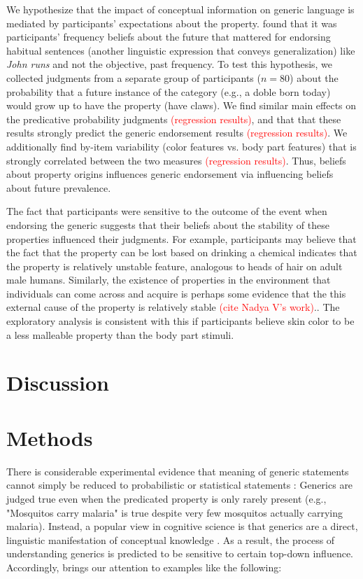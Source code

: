 \documentclass[floatsintext, 11pt, doc]{apa6}
\newcommand{\red}[1]{\textcolor{Red}{#1}}
\begin{document}
We hypothesize that the impact of conceptual information on generic language is mediated by participants' expectations about the property.  found that it was participants' frequency beliefs about the future that mattered for endorsing habitual sentences (another linguistic expression that conveys generalization) like \emph{John runs} and not the objective, past frequency. 
To test this hypothesis, we collected judgments from a separate group of participants ($n = 80$) about the probability that a future instance of the category (e.g., a doble born today) would grow up to have the property (have claws).
We find similar main effects on the predicative probability judgments \red{(regression results)}, and that that these results strongly predict the generic endorsement results \red{(regression results)}.
We additionally find by-item variability (color features vs. body part features) that is strongly correlated between the two measures  \red{(regression results)}. 
Thus, beliefs about property origins influences generic endorsement via influencing beliefs about future prevalence. 

The fact that participants were sensitive to the outcome of the event when endorsing the generic suggests that their beliefs about the stability of these properties influenced their judgments.
For example, participants may believe that the fact that the property can be lost based on drinking a chemical indicates that the property is relatively unstable feature, analogous to heads of hair on adult male humans.
Similarly, the existence of properties in the environment that individuals can come across and acquire is perhaps some evidence that the this external cause of the property is relatively stable \red{(cite Nadya V's work)}.. 
The exploratory analysis is consistent with this if participants believe skin color to be a less malleable property than the body part stimuli.

\section{Discussion}

\section{Methods}



There is considerable experimental evidence that meaning of generic statements cannot simply be reduced to probabilistic or statistical statements : Generics are judged true even when the predicated property is only rarely present (e.g., "Mosquitos carry malaria" is true despite very few mosquitos actually carrying malaria).
Instead, a popular view in cognitive science is that generics are a direct, linguistic manifestation of conceptual knowledge \cite{Prasada, Leslie}.  
As a result, the process of understanding generics is predicted to be sensitive to certain top-down influence.
Accordingly,  brings our attention to examples like the following:
\end{document}
